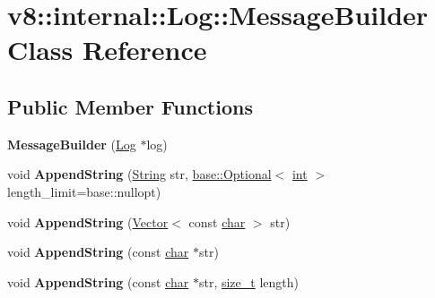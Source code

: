 \hypertarget{classv8_1_1internal_1_1Log_1_1MessageBuilder}{}\section{v8\+:\+:internal\+:\+:Log\+:\+:Message\+Builder Class Reference}
\label{classv8_1_1internal_1_1Log_1_1MessageBuilder}
\subsection*{Public Member Functions}
\begin{DoxyCompactItemize}
\item 
\mbox{\label{classv8_1_1internal_1_1Log_1_1MessageBuilder_a0f2e33e904cb1955de34a5f046416ff2}} 
{\bfseries Message\+Builder} (\mbox{\hyperlink{classv8_1_1internal_1_1Log}{Log}} $\ast$log)
\item 
\mbox{\label{classv8_1_1internal_1_1Log_1_1MessageBuilder_aad82b8aacac972a50aaf3a6aeeeab64e}} 
void {\bfseries Append\+String} (\mbox{\hyperlink{classv8_1_1internal_1_1String}{String}} str, \mbox{\hyperlink{classv8_1_1base_1_1Optional}{base\+::\+Optional}}$<$ \mbox{\hyperlink{classint}{int}} $>$ length\+\_\+limit=base\+::nullopt)
\item 
\mbox{\label{classv8_1_1internal_1_1Log_1_1MessageBuilder_ac4544edfc8f82d6629af8107ba4e5f01}} 
void {\bfseries Append\+String} (\mbox{\hyperlink{classv8_1_1internal_1_1Vector}{Vector}}$<$ const \mbox{\hyperlink{classchar}{char}} $>$ str)
\item 
\mbox{\label{classv8_1_1internal_1_1Log_1_1MessageBuilder_aed1b6d34fa98952ef5e0dab82aeb1094}} 
void {\bfseries Append\+String} (const \mbox{\hyperlink{classchar}{char}} $\ast$str)
\item 
\mbox{\label{classv8_1_1internal_1_1Log_1_1MessageBuilder_ae0f8aa366258efcac4cf51e65e499b13}} 
void {\bfseries Append\+String} (const \mbox{\hyperlink{classchar}{char}} $\ast$str, \mbox{\hyperlink{classsize__t}{size\+\_\+t}} length)
\item 

\end{DoxyCompactItemize}
